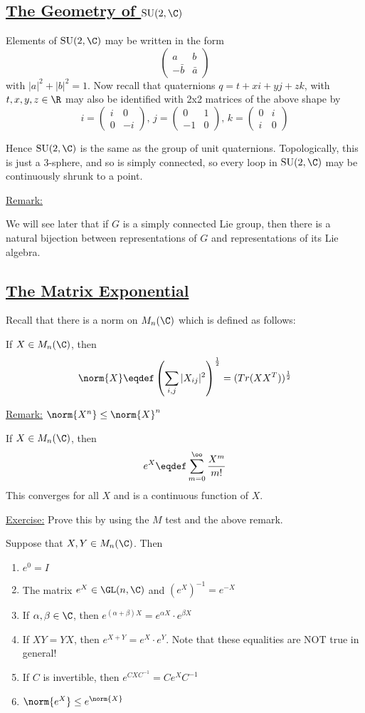 \documentclass[x11names,reqno,14pt]{extarticle}
\newcommand{\pmat}[4]{\begin{pmatrix} #1 & #2 \\ #3 & #4 \end{pmatrix}}
\DeclareMathOperator{\SU}{SU}
\begin{document}
\subsection*{\underline{The Geometry of $\SU(2,\C)$}}

Elements of $\SU(2,\C)$ may be written in the form
\[
\pmat{a}{b}{-\bar{b}}{\bar{a}}
\]
with $|a|^2 + |b|^2 = 1$. Now recall that quaternions $q = t + xi + yj + zk$, with $t, x, y,z\in\R$ may also be identified with 2x2 matrices of the above shape by 
\[
i = \pmat{i}{0}{0}{-i},\,j=\pmat{0}{1}{-1}{0},\, k = \pmat{0}{i}{i}{0}
\]

Hence $\SU(2,\C)$ is the same as the group of unit quaternions. Topologically, this is just a 3-sphere, and so is simply connected, so every loop in $\SU(2,\C)$ may be continuously shrunk to a point. 

\underline{Remark:}

We will see later that if $G$ is a simply connected Lie group, then there is a natural bijection between representations of $G$ and representations of its Lie algebra. 

\subsection*{\underline{The Matrix Exponential}}

Recall that there is a norm on $M_n(\C)$ which is defined as follows: 

If $X \in M_n(\C)$, then 
\[
\norm{X} \eqdef \left(\sum_{i,j}|X_{ij}|^2 \right)^\frac12
 = (Tr(XX^T))^\frac12
\]

\underline{Remark:} $\norm{X^n} \leq \norm{X}^n$


If $X \in M_n(\C)$, then 
\[
e^X \eqdef \sum_{m=0}^\oo\frac{X^m}{m!}
\]
This converges for all $X$ and is a continuous function of $X$.

\underline{Exercise:} Prove this by using the $M$ test and the above remark. 

\prop

Suppose that $X, Y \in M_n(\C)$. Then 
\,
\begin{enumerate}

\item $e^0 = I$ 

\item The matrix $e^X \in \GL(n,\C)$ and $(e^X)^{-1} = e^{-X}$

\item If $\alpha,\beta\in\C$, then $e^{(\alpha + \beta)X} = e^{\alpha X} \cdot e^{\beta X}$

\item If $XY = YX$, then $e^{X + Y} = e^{X}\cdot e^{Y}$. Note that these equalities are NOT true in general!

\item If $C$ is invertible, then $e^{CXC^{-1}} = Ce^XC^{-1}$ 

\item $\norm{e^X} \leq e^{\norm{X}}$

\end{enumerate}
\end{document}

